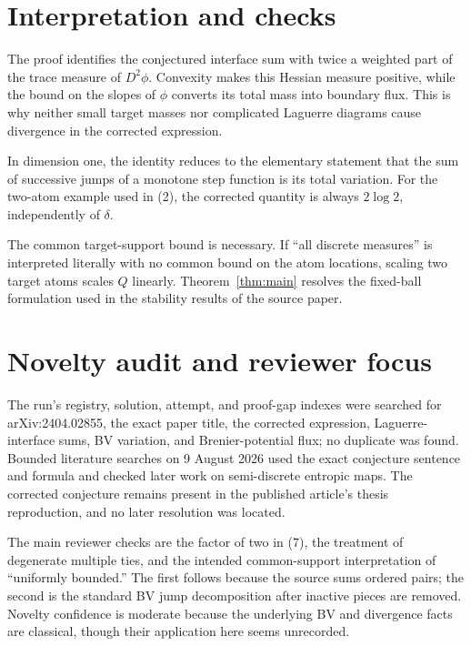 \documentclass[11pt]{article}
\begin{document}
\section{Interpretation and checks}

The proof identifies the conjectured interface sum with twice a weighted
part of the trace measure of $D^2\phi$.  Convexity makes this Hessian measure
positive, while the bound on the slopes of $\phi$ converts its total mass
into boundary flux.  This is why neither small target masses nor complicated
Laguerre diagrams cause divergence in the corrected expression.

In dimension one, the identity reduces to the elementary statement that the
sum of successive jumps of a monotone step function is its total variation.
For the two-atom example used in (2), the corrected quantity is always
$2\log2$, independently of $\delta$.

The common target-support bound is necessary.  If ``all discrete measures''
is interpreted literally with no common bound on the atom locations, scaling
two target atoms scales $Q$ linearly.  Theorem~\ref{thm:main} resolves the
fixed-ball formulation used in the stability results of the source paper.

\section{Novelty audit and reviewer focus}

The run's registry, solution, attempt, and proof-gap indexes were searched
for arXiv:2404.02855, the exact paper title, the corrected expression,
Laguerre-interface sums, BV variation, and Brenier-potential flux; no
duplicate was found.  Bounded literature searches on 9 August 2026 used the
exact conjecture sentence and formula and checked later work on semi-discrete
entropic maps.  The corrected conjecture remains present in the published
article's thesis reproduction, and no later resolution was located.

The main reviewer checks are the factor of two in (7), the treatment of
degenerate multiple ties, and the intended common-support interpretation of
``uniformly bounded.''  The first follows because the source sums ordered
pairs; the second is the standard BV jump decomposition after inactive
pieces are removed.  Novelty confidence is moderate because the underlying
BV and divergence facts are classical, though their application here seems
unrecorded.
\end{document}
